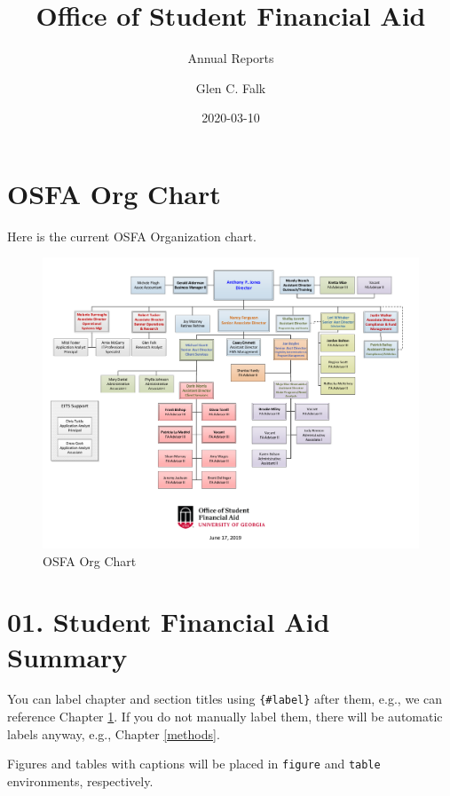 \documentclass[
]{book}
\title{Office of Student Financial Aid}
\subtitle{Annual Reports}
\author{Glen C. Falk}
\date{2020-03-10}
\begin{document}
\maketitle

{
\setcounter{tocdepth}{1}
\tableofcontents
}
\hypertarget{osfa-org-chart}{%
\chapter*{OSFA Org Chart}\label{osfa-org-chart}}

Here is the current OSFA Organization chart.

\begin{figure}

{\centering \includegraphics[width=1\linewidth]{images/OSFAOrgChart} 

}

\caption{OSFA Org Chart}\label{fig:label}
\end{figure}

\hypertarget{intro}{%
\chapter{01. Student Financial Aid Summary}\label{intro}}

You can label chapter and section titles using \texttt{\{\#label\}} after them, e.g., we can reference Chapter \ref{intro}. If you do not manually label them, there will be automatic labels anyway, e.g., Chapter \ref{methods}.

Figures and tables with captions will be placed in \texttt{figure} and \texttt{table} environments, respectively.
\end{document}
